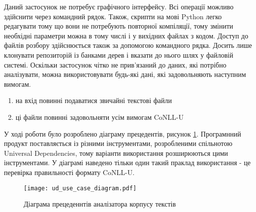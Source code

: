Даний застосунок не потребує графічного інтерфейсу. Всі операції можливо здійснити
через командний рядок. Також, скрипти на мові Python легко редагувати тому що вони не
потребують повторної компіляції, тому змінити необхідні параметри можна в тому
числі і у вихідних файлах з кодом. Доступ до файлів розбору здійснюється
також за допомогою командного рядка. Досить лише клонувати репозиторій із
банками дерев і вказати до нього шлях у файловій системі. Оскільки застосунок
чітко не прив'язаний до даних, які потрібно аналізувати, можна використовувати будь-які
дані, які задовольняють наступним вимогам.

\begin{enumerate}
    \item на вхід повинні подаватися звичайні текстові файли
    \item ці файли повинні задовольняти усім вимогам CoNLL-U
\end{enumerate}

У ході роботи було розроблено діаграму прецедентів, рисунок \ref{img:use_case_diagram}. Програмнний продукт поставляється із різними
інструментами, розробленими спільнотою Universal Dependencies, тому
варіанти використання розширюються цими інструментами. У діаграмі наведено
тільки один такий праклад використання - це перевірка правильності формату
CoNLL-U.

\begin{figure}[p]
  \begin{center}
    \texttt{[image: ud\_use\_case\_diagram.pdf]}
  \end{center}
  \caption{Діаграма прецеденнтів аналізатора корпусу текстів}
  \label{img:use_case_diagram}
\end{figure}
\newpage

